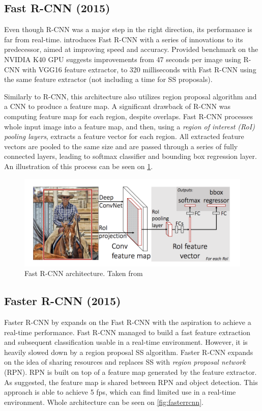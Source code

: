 \subsection{Fast R-CNN (2015)}
Even though R-CNN was a major step in the right direction, its performance is far from real-time. \citeauthor{bib:fastrcnn} \cite{bib:fastrcnn} introduces Fast R-CNN with a series of innovations to its predecessor, aimed at improving speed and accuracy. Provided benchmark on the NVIDIA K40 GPU suggests improvements from 47 seconds per image using R-CNN with VGG16 feature extractor, to 320 milliseconds with Fast R-CNN using the same feature extractor (not including a time for SS proposals). 

Similarly to R-CNN, this architecture also utilizes region proposal algorithm and a CNN to produce a feature map. A significant drawback of R-CNN was computing feature map for each region, despite overlaps. Fast R-CNN processes whole input image into a feature map, and then, using a \textit{region of interest (RoI) pooling layers}, extracts a feature vector for each region. All extracted feature vectors are pooled to the same size and are passed through a series of fully connected layers, leading to softmax classifier and bounding box regression layer. An illustration of this process can be seen on \cref{fig:fastrcnn}.

\begin{figure}
    \centering
    \includegraphics[width=\textwidth]{img/fastrcnn}
    \caption[Fast R-CNN architecture]%
    {Fast R-CNN architecture. Taken from \cite[fig. 1]{bib:fastrcnn}}
    \label{fig:fastrcnn}
\end{figure}

\subsection{Faster R-CNN (2015)}
 
Faster R-CNN by \citeauthor{bib:fasterrcnn} \cite{bib:fasterrcnn} expands on the Fast R-CNN with the aspiration to achieve a real-time performance. Fast R-CNN managed to build a fast feature extraction and subsequent classification usable in a real-time environment. However, it is heavily slowed down by a region proposal SS algorithm. Faster R-CNN expands on the idea of sharing resources and replaces SS with \textit{region proposal network} (RPN). RPN is built on top of a feature map generated by the feature extractor. As suggested, the feature map is shared between RPN and object detection. This approach is able to achieve 5 fps, which can find limited use in a real-time environment. Whole architecture can be seen on \cref{fig:fasterrcnn}. 
 

